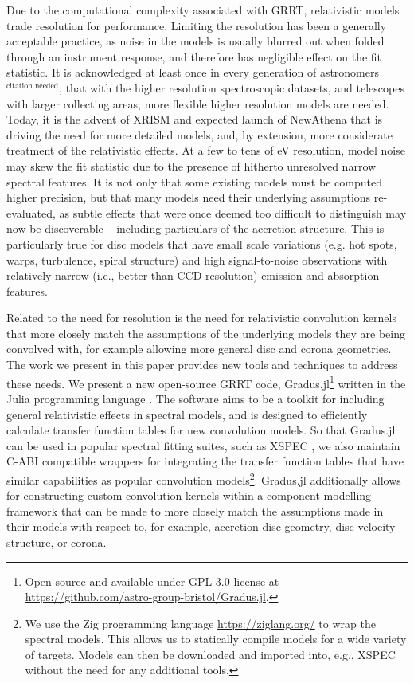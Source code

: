 \documentclass[fleqn,usenatbib]{mnras}
\newcommand{\citneeded}{{\bf \color{red} $^{\text{citation needed}}$}}
\newcommand{\Gradus}{Gradus.jl\xspace}
\begin{document}
Due to the computational complexity associated with GRRT, relativistic models
trade resolution for performance. Limiting the resolution has been a generally
acceptable practice, as noise in the models is usually blurred out when folded
through an instrument response, and therefore has negligible effect on the fit
statistic. It is acknowledged at least once in every generation of
astronomers\citneeded, that with the higher resolution spectroscopic datasets,
and telescopes with larger collecting areas, more flexible higher resolution
models are needed. Today, it is the advent of XRISM \citep{tashiro_xrism_2020}
and expected launch of NewAthena \citep{barret_athena_2013} that is driving the
need for more detailed models, and, by extension, more considerate treatment of
the relativistic effects. At a few to tens of eV resolution, model noise may
skew the fit statistic due to the presence of hitherto unresolved narrow
spectral features. It is not only that some existing models must be computed
higher precision, but that many models need their underlying assumptions
re-evaluated, as subtle effects that were once deemed too difficult to
distinguish may now be discoverable -- including particulars of the accretion
structure. This is particularly true for disc models that have small scale
variations (e.g. hot spots, warps, turbulence, spiral structure) and high
signal-to-noise observations with relatively narrow (i.e., better than
CCD-resolution) emission and absorption features.

Related to the need for resolution is the need for relativistic convolution
kernels that more closely match the assumptions of the underlying models they
are being convolved with, for example allowing more general disc and corona
geometries. The work we present in this paper provides new tools and techniques
to address these needs. We present a new open-source GRRT code,
\Gradus\footnote{Open-source and available under GPL 3.0 license at
\url{https://github.com/astro-group-bristol/Gradus.jl}.} written in the Julia
programming language \citep{Bezanson_Julia_A_fresh_2017}. The software aims to
be a toolkit for including general relativistic effects in spectral models, and
is designed to efficiently calculate transfer function tables for new
convolution models. So that \Gradus can be used in popular spectral fitting
suites, such as XSPEC \citep{arnaud_xspec_1996}, we also maintain C-ABI
compatible wrappers for integrating the transfer function tables that have
similar capabilities as popular convolution models\footnote{We use the Zig
programming language \url{https://ziglang.org/} to wrap the spectral models.
This allows us to statically compile models for a wide variety of targets.
Models can then be downloaded and imported into, e.g., XSPEC without the need
for any additional tools.}. \Gradus additionally allows for constructing custom
convolution kernels within a component modelling framework that can be made to
more closely match the assumptions made in their models with respect to, for
example, accretion disc geometry, disc velocity structure, or corona.
\end{document}
